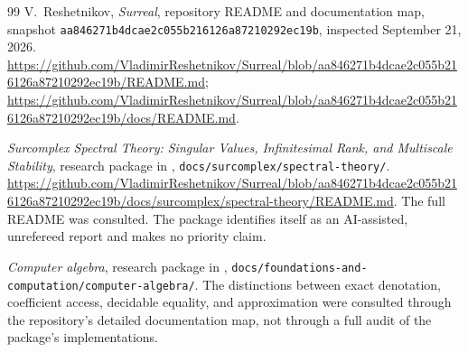 \documentclass[11pt,letterpaper]{article}
\numberwithin{equation}{section}
\theoremstyle{definition}
\theoremstyle{remark}
\newcommand{\Commit}{\nolinkurl{aa846271b4dcae2c055b216126a87210292ec19b}}
\begin{document}
\begin{thebibliography}{99}
V.~Reshetnikov, \emph{Surreal}, repository README and documentation map,
snapshot \Commit, inspected September 21, 2026.
\url{https://github.com/VladimirReshetnikov/Surreal/blob/aa846271b4dcae2c055b216126a87210292ec19b/README.md};
\url{https://github.com/VladimirReshetnikov/Surreal/blob/aa846271b4dcae2c055b216126a87210292ec19b/docs/README.md}.

\emph{Surcomplex Spectral Theory: Singular Values, Infinitesimal Rank,
and Multiscale Stability}, research package in \cite{RepoMain},
\texttt{docs/surcomplex/spectral-theory/}.
\url{https://github.com/VladimirReshetnikov/Surreal/blob/aa846271b4dcae2c055b216126a87210292ec19b/docs/surcomplex/spectral-theory/README.md}.
The full README was consulted. The package identifies itself as an
AI-assisted, unrefereed report and makes no priority claim.

\emph{Computer algebra}, research package in \cite{RepoMain},
\nolinkurl{docs/foundations-and-computation/computer-algebra/}.
The distinctions between exact denotation, coefficient access, decidable
equality, and approximation were consulted through the repository's detailed
documentation map, not through a full audit of the package's implementations.
\end{thebibliography}
\end{document}
